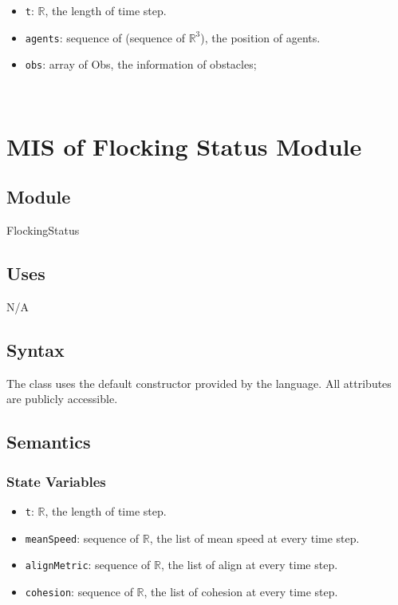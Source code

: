 \documentclass[12pt, titlepage]{article}
\begin{document}
\begin{itemize}
\item \texttt{t}: $\mathbb{R}$, the length of time step. 
\item \texttt{agents}: sequence of (sequence of $\mathbb{R}^3$), the position of agents. 
\item \texttt{obs}: array of Obs, the information of obstacles;
\end{itemize}


~\newpage

\section{MIS of Flocking Status Module} \label{mFS}

\subsection{Module}

FlockingStatus

\subsection{Uses}

N/A

\subsection{Syntax}

The class uses the default constructor provided by the language. All 
attributes are publicly accessible.

\subsection{Semantics}

\subsubsection{State Variables}

\begin{itemize}
\item \texttt{t}: $\mathbb{R}$, the length of time step. 
\item \texttt{meanSpeed}: sequence of $\mathbb{R}$, the list of mean speed at every time step. 
\item \texttt{alignMetric}: sequence of $\mathbb{R}$, the list of align at every time step.
\item \texttt{cohesion}: sequence of $\mathbb{R}$, the list of cohesion at every time step.
\end{itemize}
\end{document}
